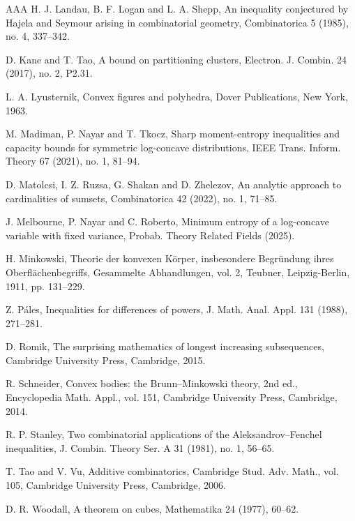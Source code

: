 \documentclass[a4paper,reqno,12pt]{amsart}
\newcommand{\1}{\bo{1}}
\begin{document}
\begin{thebibliography}{AAA}
 H. J. Landau, B. F. Logan and L. A. Shepp, An inequality conjectured by Hajela and Seymour arising in combinatorial geometry, Combinatorica 5 (1985), no. 4, 337--342.

 D. Kane and T. Tao, A bound on partitioning clusters, Electron. J. Combin. 24 (2017), no. 2, P2.31.

 L. A. Lyusternik, Convex figures and polyhedra, Dover Publications, New York, 1963.

 M. Madiman, P. Nayar and T. Tkocz, Sharp moment-entropy inequalities and capacity bounds for symmetric log-concave distributions, IEEE Trans. Inform. Theory 67 (2021), no. 1, 81--94.

 D. Matolcsi, I. Z. Ruzsa, G. Shakan and D. Zhelezov, An analytic approach to cardinalities of sumsets, Combinatorica 42 (2022), no. 1, 71--85.

 J. Melbourne, P. Nayar and C. Roberto, Minimum entropy of a log-concave variable with fixed variance, Probab. Theory Related Fields (2025).

 H. Minkowski, Theorie der konvexen K\"orper, insbesondere Begr\"undung ihres Oberfl\"achenbegriffs, Gesammelte Abhandlungen, vol. 2, Teubner, Leipzig-Berlin, 1911, pp. 131--229.

 Z. P\'ales, Inequalities for differences of powers, J. Math. Anal. Appl. 131 (1988), 271--281.

 D. Romik, The surprising mathematics of longest increasing subsequences, Cambridge University Press, Cambridge, 2015.

 R. Schneider, Convex bodies: the Brunn--Minkowski theory, 2nd ed., Encyclopedia Math. Appl., vol. 151, Cambridge University Press, Cambridge, 2014.

 R. P. Stanley, Two combinatorial applications of the Aleksandrov--Fenchel inequalities, J. Combin. Theory Ser. A 31 (1981), no. 1, 56--65.

 T. Tao and V. Vu, Additive combinatorics, Cambridge Stud. Adv. Math., vol. 105, Cambridge University Press, Cambridge, 2006.

 D. R. Woodall, A theorem on cubes, Mathematika 24 (1977), 60--62.

\end{thebibliography}
\end{document}

